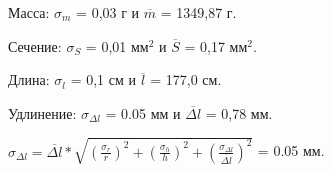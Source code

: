 \documentclass[a4paper]{article}
\begin{document}
\item Масса: $\sigma_{m}$ = 0,03 г  {   и   }  $\overline{m}$ = 1349,87 г.\\
\item Сечение: $\sigma_{S}$ = 0,01 мм$^2$  {   и   }    $\overline{S}$ = 0,17 мм$^2$.\\
\item Длина: $\sigma_{l}$ = 0,1 см  {   и   }    $\overline{l}$ = 177,0 см.\\
\item Удлинение: $\sigma_{\Delta l}$ = 0.05 мм  {   и   }    $\overline{\Delta l}$ = 0,78 мм.\\

\item $\sigma_{\Delta l} = {\overline{\Delta l}} * \sqrt{(\frac{\sigma_{r}}{r})^2 + (\frac{\sigma_{h}}{h})^2 + (\frac{\sigma_{\Delta l}}{\overline{\Delta l}})^2}$ = 0.05 мм.\\\\
\end{document}
